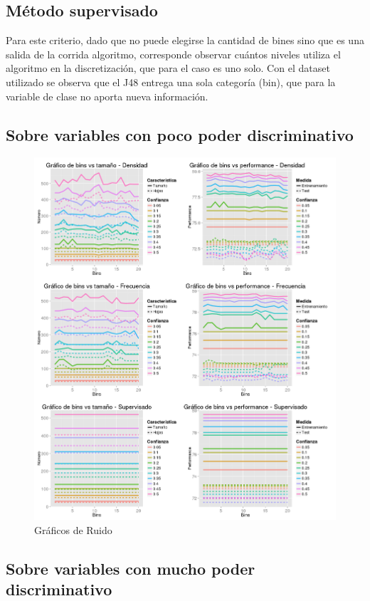 \documentclass[]{article}
\begin{document}
\subsection{Método supervisado}
Para este criterio, dado que no puede elegirse la cantidad de bines sino que es una salida de la corrida algoritmo, corresponde observar cuántos niveles utiliza el algoritmo en la discretización, que para el caso es uno solo. Con el dataset utilizado se observa que el J48 entrega una sola categoría (bin), que para la variable de clase no aporta nueva información.

\subsection{Sobre variables con poco poder discriminativo}

\begin{figure}[H]
	\includegraphics[scale = 0.4]{4_1_Bins_Todas_var}
	\caption[Ruido]{Gráficos de Ruido}
	\label{4.P4Todas}
\end{figure}


\subsection{Sobre variables con mucho poder discriminativo}
\end{document}
